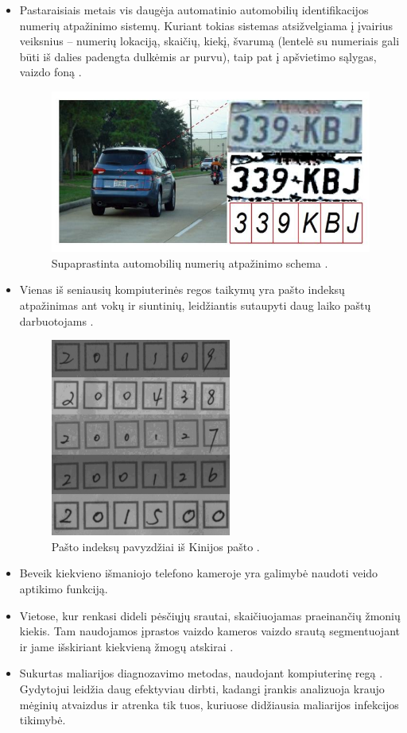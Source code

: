 \documentclass[a4paper,12pt]{article}
\begin{document}
\begin{itemize}
\item Pastaraisiais metais vis daugėja automatinio automobilių identifikacijos numerių atpažinimo sistemų. Kuriant tokias sistemas atsižvelgiama į įvairius veiksnius – numerių lokaciją, skaičių, kiekį, švarumą (lentelė su numeriais gali būti iš dalies padengta dulkėmis ar purvu), taip pat į apšvietimo sąlygas, vaizdo foną \cite{CARPLATE}.
\begin{figure}[H]
	\centering
	\includegraphics[scale=0.5]{images/carplate}
	\caption{Supaprastinta automobilių numerių atpažinimo schema \cite{PLATEIMG}.}   %
	\label{img:carplate}
\end{figure}
\item Vienas iš seniausių kompiuterinės regos taikymų yra pašto indeksų atpažinimas ant vokų ir siuntinių, leidžiantis sutaupyti daug laiko paštų darbuotojams \cite{POSTCODE}.
\begin{figure}[H]
	\centering
	\includegraphics[scale=0.4]{images/postcode}
	\caption{Pašto indeksų pavyzdžiai iš Kinijos pašto \cite{CHINAPOST}.}   %
	\label{img:postcode}
\end{figure}
\item Beveik kiekvieno išmaniojo telefono kameroje yra galimybė naudoti veido aptikimo funkciją.
\item Vietose, kur renkasi dideli pėsčiųjų srautai, skaičiuojamas praeinančių žmonių kiekis. Tam naudojamos įprastos vaizdo kameros vaizdo srautą segmentuojant ir jame išskiriant kiekvieną žmogų atskirai \cite{PEOPLECOUNT}.
\item Sukurtas maliarijos diagnozavimo metodas, naudojant kompiuterinę regą \cite{MALARIA}. Gydytojui leidžia daug efektyviau dirbti, kadangi įrankis analizuoja kraujo mėginių atvaizdus ir atrenka tik tuos, kuriuose didžiausia maliarijos infekcijos tikimybė.
\end{itemize}
\end{document}
